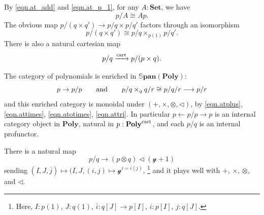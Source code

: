 \documentclass[11pt, one side, article]{memoir}
\theoremstyle{definition}
\theoremstyle{plain}
\newcommand{\Cat}[1]{\mathbf{#1}}%
\newcommand{\too}{\longrightarrow}
\newcommand{\To}[2][]{\xrightarrow[#1]{\tn{$#2$}}}
\newcommand{\from}{\leftarrow}
\newcommand{\tn}[1]{\textnormal{#1}}
\newcommand{\ol}[1]{\overline{#1}}
\newcommand{\smset}{\Cat{Set}}
\newcommand{\sspan}{\mathbb{S}\Cat{pan}}
\newcommand{\yon}{{\mathcal{y}}}
\newcommand{\poly}{\Cat{Poly}}
\newcommand{\cart}{\tn{cart}}
\newcommand{\tocart}{\To{\cart}}
\newcommand{\polycart}{\poly^\cart}
\newcommand{\0}{\textsf{0}}
\newcommand{\1}{\tn{\textsf{1}}}
\newcommand{\tri}{\mathbin{\triangleleft}}
\newcommand{\at}[2]{#1/#2}
\newcommand{\hh}[2][]{#1 \tn{#2} #1}
\newcommand{\qqand}{\hh[\qquad]{and}}
\begin{document}
By \eqref{eqn.at_add} and \eqref{eqn.at_p_1}, for any $A:\smset$, we have
\begin{equation}
\at{p}{A}\cong Ap.
\end{equation}
The obvious map $\at{p}{(q\times q')}\to\at{p}{q}\times\at{p}{q}'$ factors through an isomorphism
\begin{equation}
	\at{p}{(q\times q')}\cong\at{p}{q}\times_{p(1)}\at{p}{q}'.
\end{equation}
There is also a natural cartesian map
\begin{equation}
\at{p}{q}\tocart\at{p}{(p\times q)}.
\end{equation}


The category of polynomials is enriched in $\sspan(\poly)$:
\begin{equation}
  p\to\at{p}{p}
  \qqand
	\at{p}{q}\times_q\at{q}{r}\cong\at{\at{p}{q}}{r}\too \at{p}{r}
\end{equation}
and this enriched category is monoidal under $(+,\times,\otimes,\tri)$, by \eqref{eqn.atplus}, \eqref{eqn.attimes}, \eqref{eqn.atotimes}, \eqref{eqn.attri}. In particular $p\from\at{p}{p}\to p$ is an internal category object in $\poly$, natural in $p:\polycart$, and each $\at{p}{q}$ is an internal profunctor. 

There is a natural map
\begin{equation}
	\at{p}{q}\to(p\otimes q)\tri(\yon+1)
\end{equation}
sending $(I,J,\ol{j})\mapsto(I,J,(i,j)\mapsto \yon^{i=\ol{i}(j)}$,%
\footnote{
Here, $I:p(1)$, $J:q(1)$, $\ol{i}\colon q[J]\to p[I]$, $i:p[I]$, $j:q[J]$.
}
and it plays well with $+$, $\times$, $\otimes$, and $\tri$.
\end{document}
